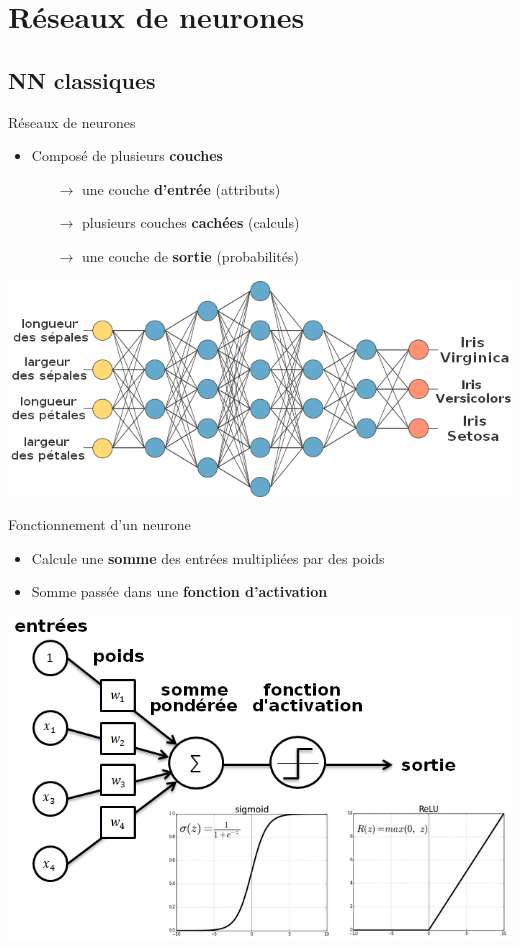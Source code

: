 \documentclass[compress]{beamer}
\begin{document}
\section{Réseaux de neurones}
\subsection{NN classiques}
\begin{frame}{Réseaux de neurones}
  \begin{itemize}
  	\item 	Composé de plusieurs \textbf{\color{fibeamer@orange}couches}
  	\begin{itemize}
  		\item[$\rightarrow$] une couche \textbf{\color{fibeamer@orange}d'entrée} (attributs)
  		\item[$\rightarrow$] plusieurs couches \textbf{\color{fibeamer@orange} cachées} (calculs)
  		\item[$\rightarrow$] une couche de \textbf{\color{fibeamer@orange}sortie} (probabilités)
  	\end{itemize}
  \end{itemize}
	\centering
	\includegraphics[width=1\linewidth]{resources/clem/simple_network2}
\end{frame}

\begin{frame}{Fonctionnement d'un neurone}
	\begin{itemize}
		\item Calcule une \textbf{\color{fibeamer@orange}somme} des entrées multipliées par des poids
		\item Somme passée dans une \textbf{\color{fibeamer@orange}fonction d'activation}
	\end{itemize}
	\centering
	\includegraphics[width=0.9\linewidth]{resources/clem/perceptron2}
\end{frame}
\end{document}
